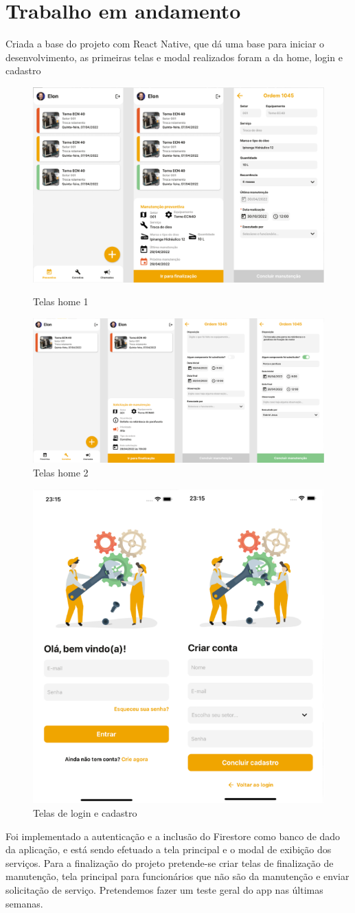 \documentclass[%
  a4paper,%
  12pt,%
  english,%
  brazilian,%
]{article}
\begin{document}
\section{Trabalho em andamento}%

Criada a base do projeto com React Native, que dá uma base para iniciar o desenvolvimento, as primeiras telas e modal realizados foram a da home, login e cadastro
\begin{figure}[H]
  \includegraphics[width = 0.6\linewidth]{Figures/t1.PNG}
  \caption{Telas home 1}
  \includegraphics[width = 0.6\linewidth]{Figures/t2.PNG}
  \caption{Telas home 2}
\end{figure}

\begin{figure}[H]
  \includegraphics[width = 0.35\linewidth]{Figures/t3.PNG}
  \caption{Telas de login e cadastro}
  \end{figure}

  Foi implementado a autenticação e a inclusão do Firestore como banco de dado da aplicação, e está sendo efetuado a tela principal e o modal de exibição dos serviços. Para a finalização do projeto pretende-se criar telas de finalização de manutenção, tela principal para funcionários que não são da manutenção e enviar solicitação de serviço. Pretendemos fazer um teste geral do app nas últimas semanas.
\end{document}
